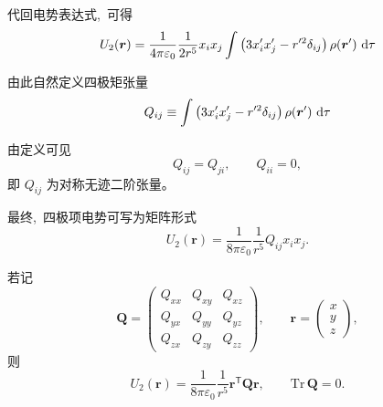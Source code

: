 代回电势表达式, \,可得
\begin{equation}
U_2(\boldsymbol r)
=
\frac{1}{4\pi\varepsilon_0}
\frac{1}{2r^{5}}
x_i x_j
\int
\left(
3x'_i x'_j
-
r'^2\delta_{ij}
\right)
\rho(\boldsymbol r')
\,\dif\tau
\end{equation}

由此自然定义四极矩张量
\begin{equation}
Q_{ij}
\equiv
\int
\left(
3x'_i x'_j
-
r'^2\delta_{ij}
\right)
\rho(\boldsymbol r')
\,\dif\tau
\end{equation}

由定义可见
\[
Q_{ij}=Q_{ji},
\qquad
Q_{ii}=0,
\]
即 $Q_{ij}$ 为对称无迹二阶张量。

最终, \,四极项电势可写为矩阵形式
\begin{equation}
U_2(\boldsymbol r)
=
\frac{1}{8\pi\varepsilon_0}
\frac{1}{r^{5}}
Q_{ij}x_i x_j.
\end{equation}

若记
\[
\boldsymbol Q=
\begin{pmatrix}
Q_{xx} & Q_{xy} & Q_{xz}\\
Q_{yx} & Q_{yy} & Q_{yz}\\
Q_{zx} & Q_{zy} & Q_{zz}
\end{pmatrix},
\qquad
\boldsymbol r=
\begin{pmatrix}
x\\y\\z
\end{pmatrix},
\]
则
\begin{equation}
U_2(\boldsymbol r)
=
\frac{1}{8\pi\varepsilon_0}
\frac{1}{r^{5}}
\boldsymbol r^{\mathsf T}
\boldsymbol Q
\boldsymbol r,
\qquad
\mathrm{Tr}\,\boldsymbol Q=0.
\end{equation}


